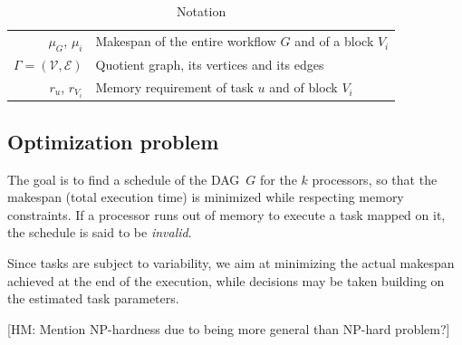 \documentclass[conference]{IEEEtran}
\newcommand{\hmey}[1]{{\color{red}[HM: #1]}}
\begin{document}
\begin{table}[h]
\begin{center}
\begin{tabular}{rl}
                $\mu_G$, $\mu_i$ & Makespan of the entire workflow $G$ and of a block $V_i$               \\
                $\Gamma = (\mathcal{V}, \mathcal{E})$                      & Quotient graph, its vertices and its edges        \\
                $r_u$, $r_{V_i}$                            & Memory requirement of task $u$ and of block $V_i$                 \\
                \hline
            \end{tabular}
        \end{center}
        \caption{Notation} \label{tabnotation}
    \end{table}



\subsection{Optimization problem}
\label{sec.mod.pb}

The goal is to find a schedule of the DAG~$G$ for the $k$ processors,
so that the makespan (total execution time) is minimized while
respecting memory constraints. If a processor runs out of memory to execute
a task mapped on it, the schedule is said to be {\em invalid}.

Since tasks are subject to variability, we aim at minimizing the actual makespan
achieved at the end of the execution, while decisions may be taken building
on the estimated task parameters.

\hmey{Mention NP-hardness due to being more general than NP-hard problem?}
\end{document}
